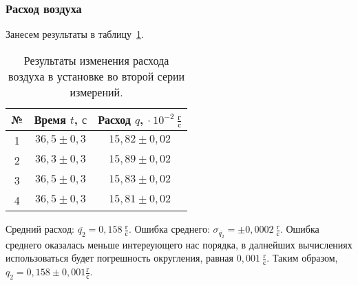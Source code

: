 \documentclass[a4paper,11pt]{article}
\begin{document}
\subsubsection{Расход воздуха}
Занесем результаты в таблицу~\ref{table:tab3}.
\begin{table}[h!]
\centering
\begin{tabular}{ ||c|c|c|| }
  \hline
  № & Время $t$, $с$ & Расход $q$, $\cdot\ 10^{-2}\ \frac{г}{с}$ \\
  \hline
  1 & $36,5 \pm 0,3$ & $15,82 \pm 0,02$ \\
  2 & $36,3 \pm 0,3$ & $15,89 \pm 0,02$ \\
  3 & $36,5 \pm 0,3$ & $15,83 \pm 0,02$ \\
  4 & $36,5 \pm 0,3$ & $15,81 \pm 0,02$ \\
  \hline
\end{tabular}
\caption{Результаты изменения расхода воздуха в установке во второй серии измерений.}
\label{table:tab3}
\end{table}
\newline
Средний расход: $\overline{q_{2}} = 0,158\ \frac{г}{с}$.\newline
Ошибка среднего: $\sigma_{\overline{q_{2}}} = \pm 0,0002\ \frac{г}{с}$.\newline
Ошибка среднего оказалась меньше интереующего нас порядка, в далнейших вычислениях использоваться будет погрешность округления, равная $0,001\ \frac{г}{с}$.
Таким образом, $q_{2} = 0,158 \pm 0,001 \frac{г}{с}$.
\end{document}
